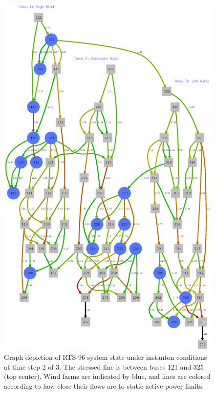 \documentclass[conference]{IEEEtran}
\begin{document}

\begin{figure}
\centering
\includegraphics[width=1\linewidth]{../images/line118}
\caption{Graph depiction of RTS-96 system state under instanton conditions at time step 2 of 3. The stressed line is between buses 121 and 325 (top center). Wind farms are indicated by blue, and lines are colored according to how close their flows are to static active power limits.}
\label{fig:line118}
\end{figure}
\end{document}
